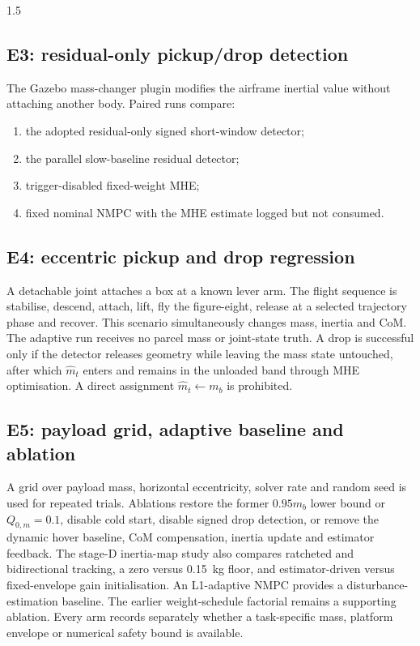 \begin{spacing}{1.5}
\subsection{E3: residual-only pickup/drop detection}

The Gazebo mass-changer plugin modifies the airframe inertial value without attaching another body. Paired runs compare:
\begin{enumerate}
    \item the adopted residual-only signed short-window detector;
    \item the parallel slow-baseline residual detector;
    \item trigger-disabled fixed-weight MHE;
    \item fixed nominal NMPC with the MHE estimate logged but not consumed.
\end{enumerate}

\subsection{E4: eccentric pickup and drop regression}

A detachable joint attaches a box at a known lever arm. The flight
sequence is stabilise, descend, attach, lift, fly the figure-eight,
release at a selected trajectory phase and recover. This scenario
simultaneously changes mass, inertia and CoM. The adaptive run receives
no parcel mass or joint-state truth. A drop is successful only if the
detector releases geometry while leaving the mass state untouched, after
which $\hat m_t$ enters and remains in the unloaded band through MHE
optimisation. A direct assignment $\hat m_t\leftarrow m_b$ is prohibited.

\subsection{E5: payload grid, adaptive baseline and ablation}

A grid over payload mass, horizontal eccentricity, solver rate and random
seed is used for repeated trials. Ablations restore the former
$0.95m_b$ lower bound or $Q_{0,m}=0.1$, disable cold start, disable signed
drop detection, or remove the dynamic hover baseline, CoM compensation,
inertia update and estimator feedback. The stage-D inertia-map study also
compares ratcheted and bidirectional tracking, a zero versus
\SI{0.15}{kg} floor, and estimator-driven versus fixed-envelope gain
initialisation. An L1-adaptive NMPC provides a disturbance-estimation
baseline. The earlier weight-schedule factorial remains a supporting
ablation. Every arm records separately whether a task-specific mass,
platform envelope or numerical safety bound is available.


\end{spacing}
